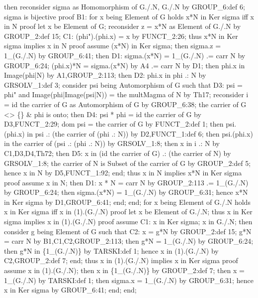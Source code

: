   then reconsider sigma as Homomorphism of G./.N, G./.N by GROUP_6:def 6;
  sigma is bijective
  proof
    B1: for x being Element of G holds x*N in Ker sigma iff x in N
    proof
      let x be Element of G;
      reconsider z = x*N as Element of G./.N by GROUP_2:def 15;
      C1: (phi").(phi.x) = x by FUNCT_2:26;
      thus x*N in Ker sigma implies x in N
      proof
        assume (x*N) in Ker sigma;
        then sigma.z = 1_(G./.N) by GROUP_6:41;
        then D1: sigma.(x*N) = 1_(G./.N)
                            .= carr N by GROUP_6:24;
        (phi.x)*N = sigma.(x*N) by A4
                 .= carr N by D1;
        then phi.x in Image(phi|N) by A1,GROUP_2:113;
        then D2: phi.x in phi .: N by GRSOLV_1:def 3;
        consider psi being Automorphism of G such that
        D3: psi = phi" and
            Image(phi|Image(psi|N)) = the multMagma of N
        by Th17;
        reconsider i = id the carrier of G as Automorphism of G by GROUP_6:38;
        the carrier of G <> \{\} & phi is onto;
        then D4: psi * phi = id the carrier of G by D3,FUNCT_2:29;
        dom psi = the carrier of G by FUNCT_2:def 1;
        then psi.(phi.x) in psi .: (the carrier of (phi .: N))
        by D2,FUNCT_1:def 6;
        then psi.(phi.x) in the carrier of (psi .: (phi .: N)) by GRSOLV_1:8;
        then x in i .: N by C1,D3,D4,Th72;
        then D5: x in (id the carrier of G) .: (the carrier of N) by GRSOLV_1:8;
        the carrier of N is Subset of the carrier of G by GROUP_2:def 5;
        hence x in N by D5,FUNCT_1:92;
      end;
      thus x in N implies x*N in Ker sigma
      proof
        assume x in N;
        then D1: x * N = carr N by GROUP_2:113
                      .= 1_(G./.N) by GROUP_6:24;
        then sigma.(x*N) = 1_(G./.N) by GROUP_6:31;
        hence x*N in Ker sigma by D1,GROUP_6:41;
      end;
    end;
    for x being Element of G./.N holds x in Ker sigma iff x in (1).(G./.N)
    proof
      let x be Element of G./.N;
      thus x in Ker sigma implies x in (1).(G./.N)
      proof
        assume C1: x in Ker sigma;
        x in G./.N;
        then consider g being Element of G such that
        C2: x = g*N by GROUP_2:def 15;
        g*N = carr N by B1,C1,C2,GROUP_2:113;
        then g*N = 1_(G./.N) by GROUP_6:24;
        then g*N in \{1_(G./.N)\} by TARSKI:def 1;
        hence x in (1).(G./.N) by C2,GROUP_2:def 7;
      end;
      thus x in (1).(G./.N) implies x in Ker sigma
      proof
        assume x in (1).(G./.N);
        then x in \{1_(G./.N)\} by GROUP_2:def 7;
        then x = 1_(G./.N) by TARSKI:def 1;
        then sigma.x = 1_(G./.N) by GROUP_6:31;
        hence x in Ker sigma by GROUP_6:41;
      end;
    end;

